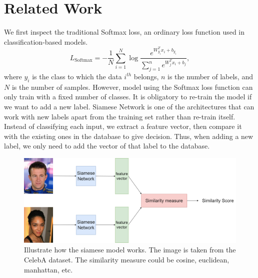 \section{Related Work}
We first inspect the traditional Softmax loss, an ordinary loss function used in classification-based models.
\begin{equation}
\label{equation01}
    L_{\text{Softmax}}=-\frac{1}{N}\sum\limits_{i=1}^{N}{\log }\frac{{{e}^{W_{{{y}_{i}}}^{T}{{x}_{i}}+{{b}_{{{y}_{i}}}}}}}{\sum\limits_{j=1}^{n}{{{e}^{W_{j}^{T}{{x}_{i}}+{{b}_{j}}}}}},
\end{equation}
where ${{y}_{i}}$ is the class to which the data ${{i}^{th}}$ belongs, $n$ is the number of labels, and $N$ is the number of samples. However, model using the Softmax loss function can only train with a fixed number of classes. It is obligatory to re-train the model if we want to add a new label. Siamese Network \cite{bromley1993signature} is one of the architectures that can work with new labels apart from the training set rather than re-train itself. Instead of classifying each input, we extract a feature vector, then compare it with the existing ones in the database to give decision. Thus, when adding a new label, we only need to add the vector of that label to the database.

\begin{figure}[htbp]
\label{figure01}
    \centering
    \centerline{\includegraphics[width=\linewidth]{images/Siamese_Network.drawio.png}}
    \caption{Illustrate how the siamese model works. The image is taken from the CelebA \cite{liu2015faceattributes} dataset. The similarity measure could be cosine, euclidean, manhattan, etc.}
\end{figure}

